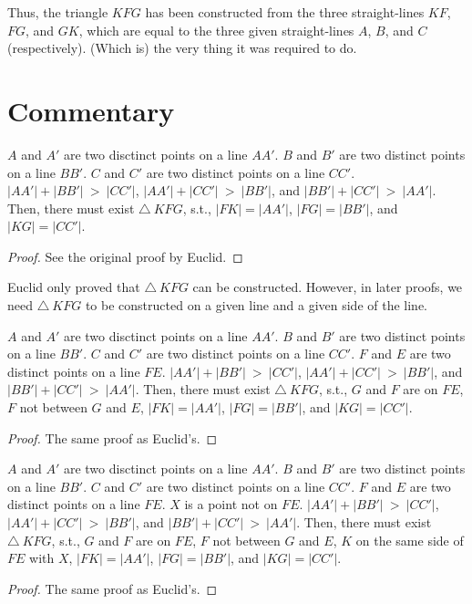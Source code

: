 Thus, the triangle $KFG$ has been constructed from the three straight-lines
$KF$, $FG$, and $GK$, which are equal to the three given straight-lines
$A$, $B$, and $C$ (respectively). (Which is) the very thing it was required
to do.


\section*{Commentary}

\begin{proposition}\label{proposition_22}\leanok
    $A$ and $A'$ are two disctinct points on a line $AA'$. $B$ and $B'$ are two distinct points on a line $BB'$. $C$ and $C'$ are two distinct points on a line $CC'$. $|AA'| + |BB'|~>~|CC'|$, $|AA'| + |CC'|~>~|BB'|$, and $|BB'| + |CC'|~>~|AA'|$. Then, there must exist $\triangle~KFG$, s.t., $|FK| = |AA'|$, $|FG| = |BB'|$, and $|KG| = |CC'|$.
\end{proposition}
\begin{proof}
    \leanok
    See the original proof by Euclid.
\end{proof}


Euclid only proved that $\triangle~KFG$ can be constructed. However, in later proofs, we need $\triangle~KFG$ to be constructed on a given line and a given side of the line.

\begin{proposition}\label{proposition_22'}\leanok
    $A$ and $A'$ are two disctinct points on a line $AA'$. $B$ and $B'$ are two distinct points on a line $BB'$. $C$ and $C'$ are two distinct points on a line $CC'$. $F$ and $E$ are two distinct points on a line $FE$. $|AA'| + |BB'|~>~|CC'|$, $|AA'| + |CC'|~>~|BB'|$, and $|BB'| + |CC'|~>~|AA'|$. Then, there must exist $\triangle~KFG$, s.t., $G$ and $F$ are on $FE$, $F$ not between $G$ and $E$, $|FK| = |AA'|$, $|FG| = |BB'|$, and $|KG| = |CC'|$.
\end{proposition}
\begin{proof}
    \leanok
    The same proof as Euclid's.
\end{proof}

\begin{proposition}\label{proposition_22''}\leanok
    $A$ and $A'$ are two disctinct points on a line $AA'$. $B$ and $B'$ are two distinct points on a line $BB'$. $C$ and $C'$ are two distinct points on a line $CC'$. $F$ and $E$ are two distinct points on a line $FE$. $X$ is a point not on $FE$. $|AA'| + |BB'|~>~|CC'|$, $|AA'| + |CC'|~>~|BB'|$, and $|BB'| + |CC'|~>~|AA'|$. Then, there must exist $\triangle~KFG$, s.t., $G$ and $F$ are on $FE$, $F$ not between $G$ and $E$, $K$ on the same side of $FE$ with $X$, $|FK| = |AA'|$, $|FG| = |BB'|$, and $|KG| = |CC'|$.
\end{proposition}
\begin{proof}
    \leanok
    The same proof as Euclid's.
\end{proof}